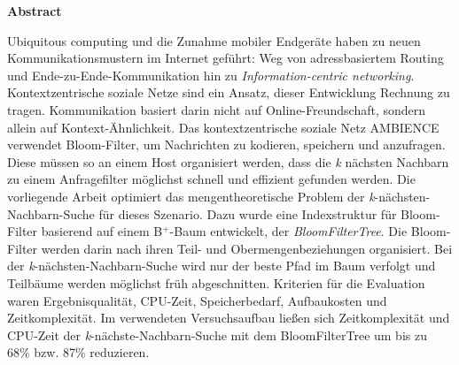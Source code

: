 %
%
\vspace*{2cm}

\begin{center}
    \textbf{Abstract}
\end{center}

\vspace*{1cm}

\noindent Ubiquitous computing und die Zunahme mobiler Endgeräte haben zu neuen Kommunikationsmustern im Internet geführt: Weg von adressbasiertem Routing und Ende-zu-Ende-Kommunikation hin zu \textit{Information-centric networking}. Kontextzentrische soziale Netze sind ein Ansatz, dieser Entwicklung Rechnung zu tragen. Kommunikation basiert darin nicht auf Online-Freundschaft, sondern allein auf Kontext-Ähnlichkeit. Das kontextzentrische soziale Netz AMBIENCE verwendet Bloom-Filter, um Nachrichten zu kodieren, speichern und anzufragen. Diese müssen so an einem Host organisiert werden, dass die \textit{k} nächsten Nachbarn zu einem Anfragefilter möglichst schnell und effizient gefunden werden. Die vorliegende Arbeit optimiert das mengentheoretische Problem der \textit{k}-nächsten-Nachbarn-Suche für dieses Szenario. Dazu wurde eine Indexstruktur für Bloom-Filter basierend auf einem B$^+$-Baum entwickelt, der \textit{BloomFilterTree}. Die Bloom-Filter werden darin nach ihren Teil- und Obermengenbeziehungen organisiert. Bei der \textit{k}-nächsten-Nachbarn-Suche wird nur der beste Pfad im Baum verfolgt und Teilbäume werden möglichst früh abgeschnitten. Kriterien für die Evaluation waren Ergebnisqualität, CPU-Zeit, Speicherbedarf, Aufbaukosten und Zeitkomplexität. Im verwendeten Versuchsaufbau ließen sich Zeitkomplexität und CPU-Zeit der \textit{k}-nächste-Nachbarn-Suche mit dem BloomFilterTree um bis zu 68\% bzw. 87\% reduzieren. 